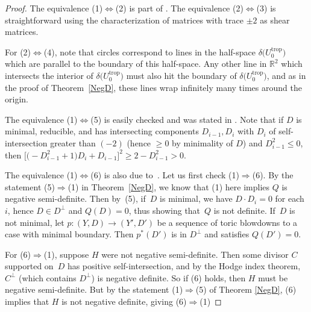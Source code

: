 \documentclass[10pt,a4paper]{amsart}
\numberwithin{equation}{section}
\numberwithin{figure}{section}
\numberwithin{table}{section}
\DeclareMathOperator{\trop}{trop}
\let\bb=\mathbb
\let\rar=\rightarrow
\theoremstyle{definition}
\begin{document}
\begin{proof}
The equivalence (1)$\Leftrightarrow$(2) is part of \cite[Lemma 1.5, arXiv v1]{GHK1}. The equivalence (2)$\Leftrightarrow$(3) is straightforward using the characterization of matrices with trace $\pm 2$ as shear matrices.

For (2)$\Leftrightarrow$(4), note that circles correspond to lines in the half-space $\delta\big(U_0^{\trop}\big)$ which are parallel to the boundary of this half-space. Any other line in $\bb{R}^2$ which intersects the interior of $\delta\big(U_0^{\trop}\big)$ must also hit the boundary of $\delta\big(U_0^{\trop}\big)$, and as in the proof of Theorem~\ref{NegD}, these lines wrap infinitely many times around the origin.

The equivalence (1)$\Leftrightarrow$(5) is easily checked and was stated in \cite[Section~0.5.2, arXiv v1]{GHK1}. Note that if $D$ is minimal, reducible, and has intersecting components $D_{i-1}, D_i$ with $D_i$ of self-inter\-section greater than $(-2)$ (hence $\geq 0$ by minimality of $D$) and $D_{i-1}^2\leq 0$, then $\big[\big({-}D_{i-1}^2+1\big)D_i+D_{i-1}\big]^2\geq 2-D_{i-1}^2 > 0$.

The equivalence (1)$\Leftrightarrow$(6) is also due to~\cite{GHK2}. Let us first check (1)$\Rightarrow$(6). By the statement (5)$\Rightarrow$(1) in Theorem~\ref{NegD}, we know that (1) here implies $Q$ is negative semi-definite. Then by~(5), if~$D$ is minimal, we have $D\cdot D_i=0$ for each $i$, hence $D\in D^{\perp}$ and $Q(D)=0$, thus showing that~$Q$ is not definite. If~$D$ is not minimal, let $p\colon (Y,D)\rar (Y',D')$ be a sequence of toric blowdowns to a case with minimal boundary. Then $p^*(D')$ is in $D^{\perp}$ and satisfies $Q(D')=0$.

For (6)$\Rightarrow$(1), suppose $H$ were not negative semi-definite. Then some divisor $C$ supported on~$D$ has positive self-intersection, and by the Hodge index theorem, $C^{\perp}$ (which contains $D^{\perp}$) is negative definite. So if (6) holds, then $H$ must be negative semi-definite. But by the statement (1)$\Rightarrow$(5) of Theorem \ref{NegD}, (6) implies that $H$ is not negative definite, giving (6)$\Rightarrow$(1)


\end{proof}
\end{document}

